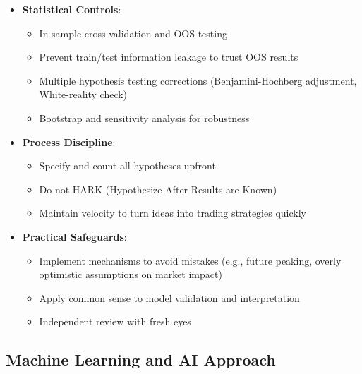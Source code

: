 \documentclass[11pt, letterpaper]{article}
\begin{document}
  \begin{itemize}
    \item \textbf{Statistical Controls}:

      \begin{itemize}
        \item In-sample cross-validation and OOS testing

        \item Prevent train/test information leakage to trust OOS results

        \item Multiple hypothesis testing corrections (Benjamini-Hochberg
          adjustment, White-reality check)

        \item Bootstrap and sensitivity analysis for robustness
      \end{itemize}

    \item \textbf{Process Discipline}:

      \begin{itemize}
        \item Specify and count all hypotheses upfront

        \item Do not HARK (Hypothesize After Results are Known)

        \item Maintain velocity to turn ideas into trading strategies quickly
      \end{itemize}

    \item \textbf{Practical Safeguards}:

      \begin{itemize}
        \item Implement mechanisms to avoid mistakes (e.g., future
          peaking, overly optimistic assumptions on market impact)

        \item Apply common sense to model validation and interpretation

        \item Independent review with fresh eyes
      \end{itemize}
  \end{itemize}

  \subsection{Machine Learning and AI Approach}
  \label{machine-learning-and-ai-approach}
\end{document}
